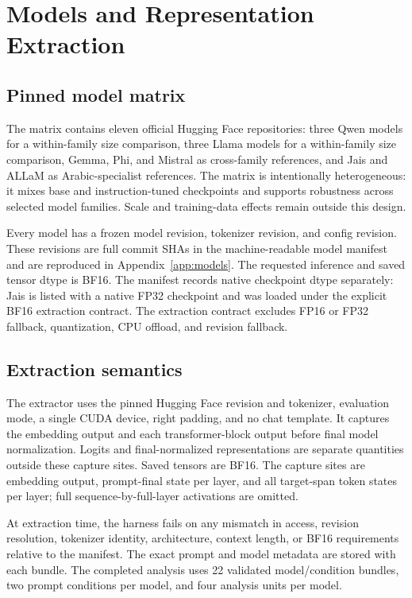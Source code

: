 \documentclass[pdflatex,sn-basic]{sn-jnl}
\begin{document}
\section{Models and Representation Extraction}

\subsection{Pinned model matrix}

The matrix contains eleven official Hugging Face repositories: three Qwen
models for a within-family size comparison, three Llama models for a
within-family size comparison, Gemma, Phi, and Mistral as cross-family
references, and Jais and ALLaM as Arabic-specialist references. The matrix is
intentionally heterogeneous: it mixes base and instruction-tuned checkpoints
and supports robustness across selected model families. Scale and training-data
effects remain outside this design.

Every model has a frozen model revision, tokenizer revision, and config
revision. These revisions are full commit SHAs in the machine-readable model
manifest and are reproduced in Appendix~\ref{app:models}. The requested
inference and saved tensor dtype is BF16. The manifest records native
checkpoint dtype separately: Jais is listed with a native FP32 checkpoint and
was loaded under the explicit BF16 extraction contract. The extraction contract
excludes FP16 or FP32 fallback, quantization, CPU offload, and revision
fallback.

\subsection{Extraction semantics}

The extractor uses the pinned Hugging Face revision and tokenizer, evaluation
mode, a single CUDA device, right padding, and no chat template. It captures
the embedding output and each transformer-block output before final model
normalization. Logits and final-normalized representations are separate
quantities outside these capture sites. Saved tensors are BF16. The capture
sites are embedding output, prompt-final state per layer, and all target-span
token states per layer; full sequence-by-full-layer activations are omitted.

At extraction time, the harness fails on any mismatch in access, revision
resolution, tokenizer identity, architecture, context length, or BF16
requirements relative to the manifest. The exact prompt and model metadata are stored with each
bundle. The completed analysis uses 22 validated model/condition bundles,
two prompt conditions per model, and four analysis units per model.
\end{document}

